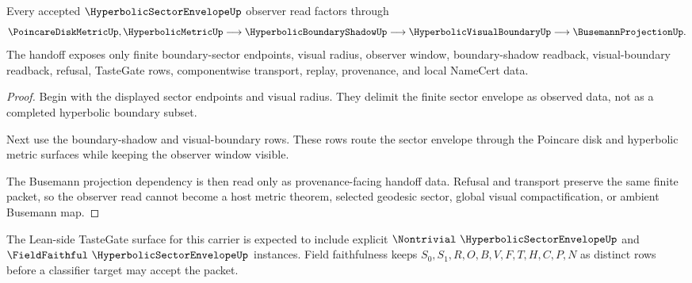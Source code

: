 \begin{theorem}
\label{thm:hyperbolic-sector-envelope-observer-handoff}
Every accepted $\HyperbolicSectorEnvelopeUp$ observer read factors through
$$
\PoincareDiskMetricUp,\HyperbolicMetricUp \longrightarrow \HyperbolicBoundaryShadowUp \longrightarrow \HyperbolicVisualBoundaryUp \longrightarrow \BusemannProjectionUp .
$$
The handoff exposes only finite boundary-sector endpoints, visual radius, observer window, boundary-shadow readback, visual-boundary readback, refusal, TasteGate rows, componentwise transport, replay, provenance, and local NameCert data.
\end{theorem}
\begin{proof}
Begin with the displayed sector endpoints and visual radius. They delimit the finite sector envelope as observed data, not as a completed hyperbolic boundary subset.

Next use the boundary-shadow and visual-boundary rows. These rows route the sector envelope through the Poincare disk and hyperbolic metric surfaces while keeping the observer window visible.

The Busemann projection dependency is then read only as provenance-facing handoff data. Refusal and transport preserve the same finite packet, so the observer read cannot become a host metric theorem, selected geodesic sector, global visual compactification, or ambient Busemann map.
\end{proof}



The Lean-side TasteGate surface for this carrier is expected to include explicit $\Nontrivial\ \HyperbolicSectorEnvelopeUp$ and $\FieldFaithful\ \HyperbolicSectorEnvelopeUp$ instances. Field faithfulness keeps $S_0,S_1,R,O,B,V,F,T,H,C,P,N$ as distinct rows before a classifier target may accept the packet.


